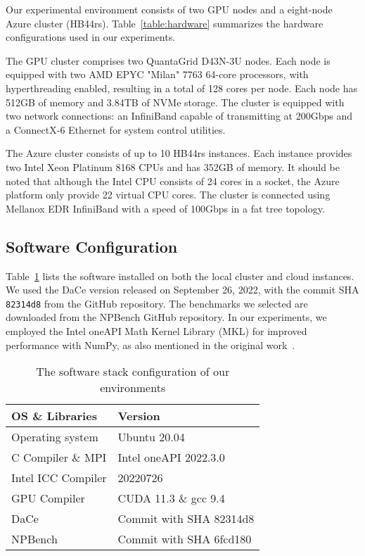 Our experimental environment consists of two GPU nodes and a eight-node Azure cluster (HB44rs). Table~\ref{table:hardware} summarizes the hardware configurations used in our experiments.

The GPU cluster comprises two QuantaGrid D43N-3U nodes. Each node is equipped with two AMD EPYC "Milan" 7763 64-core processors, with hyperthreading enabled, resulting in a total of 128 cores per node. Each node has 512GB of memory and 3.84TB of NVMe storage. The cluster is equipped with two network connections: an InfiniBand capable of transmitting at 200Gbps and a ConnectX-6 Ethernet for system control utilities.

The Azure cluster consists of up to 10 HB44rs instances. Each instance provides two Intel Xeon Platinum 8168 CPUs and has 352GB of memory. It should be noted that although the Intel CPU consists of 24 cores in a socket, the Azure platform only provide 22 virtual CPU cores. The cluster is connected using Mellanox EDR InfiniBand with a speed of 100Gbps in a fat tree topology.

\subsection{Software Configuration}
Table~\ref{table:software} lists the software installed on both the local cluster and cloud instances. We used the DaCe version released on September 26, 2022, with the commit SHA \texttt{82314d8} from the GitHub repository. The benchmarks we selected are downloaded from the NPBench GitHub repository. In our experiments, we employed the Intel oneAPI Math Kernel Library (MKL) for improved performance with NumPy, as also mentioned in the original work~\cite{dace2021}.
\begin{table}[t]
    \centering
    \caption{The software stack configuration of our environments}
    \begin{tabular}{ll}
        \toprule
        OS \& Libraries  & Version                   \\
        \midrule
        Operating system & Ubuntu 20.04              \\
        C Compiler \& MPI & Intel oneAPI 2022.3.0   \\
        Intel ICC Compiler & 20220726       \\
        GPU Compiler     & CUDA 11.3 \& gcc 9.4  \\
        DaCe             & Commit with SHA 82314d8   \\
        NPBench          & Commit with SHA 6fcd180   \\
        \bottomrule
    \end{tabular}
    \label{table:software}
\end{table}
